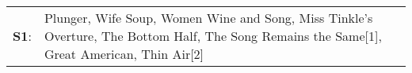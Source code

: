 \begin{supertabular}{p{0.03\textwidth}p{0.92\textwidth}}
 \textbf{S1}:  &  Plunger\textsuperscript{}, \enspace Wife Soup\textsuperscript{}, \enspace Women Wine and Song\textsuperscript{}, \enspace Miss Tinkle's Overture\textsuperscript{}, \enspace The Bottom Half\textsuperscript{}, \enspace The Song Remains the Same[1]\textsuperscript{}, \enspace Great American\textsuperscript{}, \enspace Thin Air[2]\textsuperscript{}  \enspace  \\
\end{supertabular}
